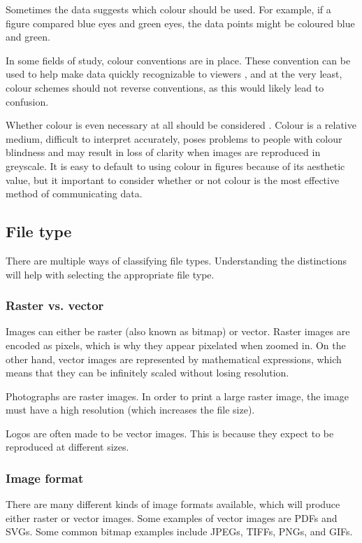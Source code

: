 \documentclass[letterpaper]{article}\usepackage[]{graphicx}\usepackage[]{color}
\begin{document}
Sometimes the data suggests which colour should be used. For example, if a figure compared blue eyes and green eyes, the data points might be coloured blue and green. 

In some fields of study, colour conventions are in place. These convention can be used to help make data quickly recognizable to viewers \cite{rheingans}, and at the very least, colour schemes should not reverse conventions, as this would likely lead to confusion. 

Whether colour is even necessary at all should be considered \cite{wong-avoid-colour}. Colour is a relative medium, difficult to interpret accurately, poses problems to people with colour blindness and may result in loss of clarity when images are reproduced in greyscale. It is easy to default to using colour in figures because of its aesthetic value, but it important to consider whether or not colour is the most effective method of communicating data.

\subsection{File type}
There are multiple ways of classifying file types. Understanding the distinctions will help with selecting the appropriate file type.

\subsubsection{Raster vs. vector}
Images can either be raster (also known as bitmap) or vector. Raster images are encoded as pixels, which is why they appear pixelated when zoomed in. On the other hand, vector images are represented by mathematical expressions, which means that they can be infinitely scaled without losing resolution. 

Photographs are raster images. In order to print a large raster image, the image must have a high resolution (which increases the file size). 

Logos are often made to be vector images. This is because they expect to be reproduced at different sizes. 

\subsubsection{Image format}
There are many different kinds of image formats available, which will produce either raster or vector images. Some examples of vector images are PDFs and SVGs. Some common bitmap examples include JPEGs, TIFFs, PNGs, and GIFs. 
\end{document}
